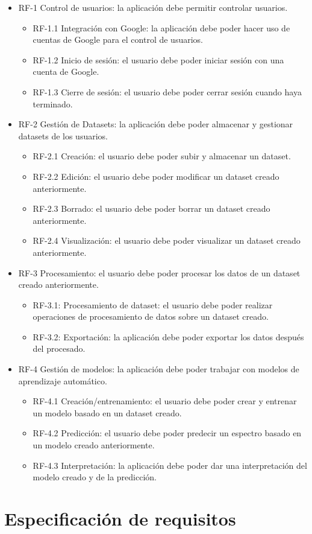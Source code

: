 \begin{itemize}
	\tightlist
	\item RF-1 Control de usuarios: la aplicación debe permitir controlar usuarios.
	\begin{itemize}
		\tightlist
		\item RF-1.1 Integración con Google: la aplicación debe poder hacer uso de cuentas de Google para el control de usuarios.
		\item RF-1.2 Inicio de sesión: el usuario debe poder iniciar sesión con una cuenta de Google.
		\item RF-1.3 Cierre de sesión: el usuario debe poder cerrar sesión cuando haya terminado.
	\end{itemize}
	\item RF-2 Gestión de Datasets: la aplicación debe poder almacenar y gestionar datasets de los usuarios.
	\begin{itemize}
		\tightlist
		\item RF-2.1 Creación: el usuario debe poder subir y almacenar un dataset.
		\item RF-2.2 Edición: el usuario debe poder modificar un dataset creado anteriormente.
		\item RF-2.3 Borrado: el usuario debe poder borrar un dataset creado anteriormente.
		\item RF-2.4 Visualización: el usuario debe poder visualizar un dataset creado anteriormente. 
	\end{itemize}
	\item RF-3 Procesamiento: el usuario debe poder procesar los datos de un dataset creado anteriormente.
	\begin{itemize}
		\tightlist
		\item RF-3.1: Procesamiento de dataset: el usuario debe poder realizar operaciones de procesamiento de datos sobre un dataset creado.
		\item RF-3.2: Exportación: la aplicación debe poder exportar los datos después del procesado.
	\end{itemize}
	\item RF-4 Gestión de modelos: la aplicación debe poder trabajar con modelos de aprendizaje automático.
	\begin{itemize}
		\tightlist
		\item RF-4.1 Creación/entrenamiento: el usuario debe poder crear y entrenar un modelo basado en un dataset creado.
		\item RF-4.2 Predicción: el usuario debe poder predecir un espectro basado en un modelo creado anteriormente.
		\item RF-4.3 Interpretación: la aplicación debe poder dar una interpretación del modelo creado y de la predicción.
	\end{itemize}
\end{itemize}
\section{Especificación de requisitos}


